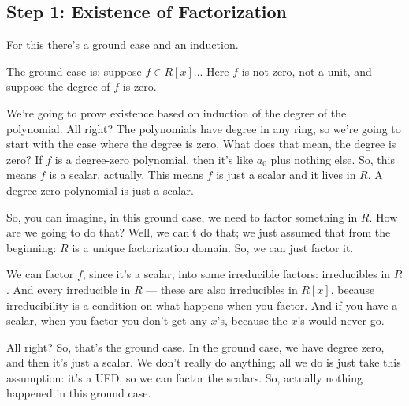 \begin{proofWrapper}

\subsection{Step 1: Existence of Factorization}

\begin{speech}[00:21:44 - 00:23:58]
For this there's a ground case and an induction.

The ground case is: suppose $f \in R[x]$...  Here $f$ is not zero, not a unit, and suppose the degree of $f$ is zero. 

We're going to prove existence based on induction of the degree of the polynomial. All right? The polynomials have degree in any ring, so we're going to start with the case where the degree is zero. What does that mean, the degree is zero? If $f$ is a degree-zero polynomial, then it's like $a_0$ plus nothing else. So, this means $f$ is a scalar, actually. This means $f$ is just a scalar and it lives in $R$.  A degree-zero polynomial is just a scalar.

So, you can imagine, in this ground case, we need to factor something in $R$. How are we going to do that? Well, we can't do that; we just assumed that from the beginning: $R$ is a unique factorization domain. So, we can just factor it.

We can factor $f$, since it's a scalar, into some irreducible factors:  irreducibles in $R$. And every irreducible in $R$ --- these are also irreducibles in $R[x]$,  because irreducibility is a condition on what happens when you factor. And if you have a scalar, when you factor you don't get any $x$'s, because the $x$'s would never go.

All right? So, that's the ground case. In the ground case, we have degree zero, and then it's just a scalar. We don't really do anything; all we do is just take this assumption: it's a UFD, so we can factor the scalars. So, actually nothing happened in this ground case.
\end{speech}


\end{proofWrapper}
